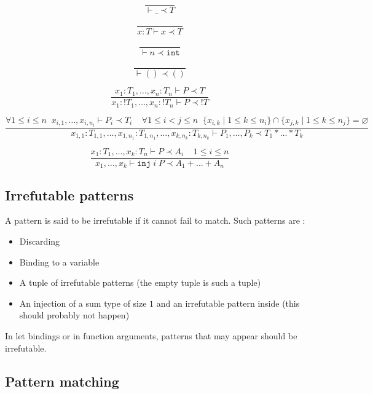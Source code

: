 \documentclass{scrartcl}
\renewcommand{\emptyset}{\varnothing}
\begin{document}
\[
  \frac{}{\vdash \_ \prec T}
\]

\[
  \frac{}{x : T \vdash x \prec T}
\]

\[
  \frac{}{\vdash n \prec \mathtt{int}}
\]

\[
  \frac{}{\vdash () \prec ()}
\]

\[
  \frac{x_1:T_1, \dots, x_n:T_n\vdash P\prec T}
  {x_1: !T_1, \dots, x_n: !T_n\vdash P\prec !T}
\]

\[
  \frac{\forall 1 \leq i \leq n \;\; x_{i, 1}, \dots, x_{i, n_i} \vdash P_i \prec T_i
    \;\;\;\; \forall 1 \leq i < j \leq n
    \;\;\{x_{i, k} \mid 1 \leq k \leq n_i \} \cap \{x_{j, k} \mid 1 \leq k \leq n_j\} = \emptyset}
  {x_{1,1}: T_{1,1}, \dots, x_{1, n_1}: T_{1, n_1}, \dots, x_{k, n_k} : T_{k, n_k} \vdash P_1, \dots, P_k \prec T_1 * \dots * T_k}
\]

\[
  \frac{x_1: T_1, \dots, x_k: T_n \vdash P \prec A_i
    \;\;\;\; 1 \leq i \leq n}
  {x_1, \dots, x_k \vdash \mathtt{inj}\;i\;P \prec A_1 + \dots + A_n}
\]

\subsection{Irrefutable patterns}
A pattern is said to be irrefutable if it cannot fail to match. Such patterns are :
\begin{itemize}
  \item Discarding
  \item Binding to a variable
  \item A tuple of irrefutable patterns (the empty tuple is such a tuple)
  \item An injection of a sum type of size $1$ and an irrefutable pattern inside
        (this should probably not happen)
\end{itemize}

In let bindings or in function arguments, patterns that may appear should be irrefutable.

\subsection{Pattern matching}
\end{document}
